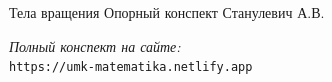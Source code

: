 \documentclass{umk-matematika}
\begin{document}
\maketitlepage
    {Тела вращения}
    {Опорный конспект}
    {Станулевич А.В.}

\begin{center}
\vspace{1.5cm}
\textit{Полный конспект на сайте:}\\
\texttt{https://umk-matematika.netlify.app}
\end{center}
\end{document}
